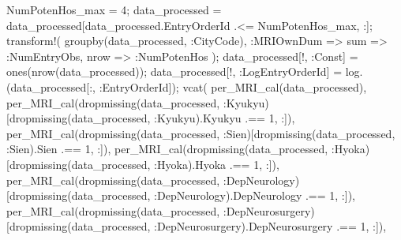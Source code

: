\documentclass[
  letterpaper,
  DIV=11,
  numbers=noendperiod]{scrreprt}
\newenvironment{Shaded}{\begin{snugshade}}{\end{snugshade}}
\newcommand{\FloatTok}[1]{\textcolor[rgb]{0.68,0.00,0.00}{#1}}
\newcommand{\FunctionTok}[1]{\textcolor[rgb]{0.28,0.35,0.67}{#1}}
\newcommand{\NormalTok}[1]{\textcolor[rgb]{0.00,0.23,0.31}{#1}}
\newcommand{\OperatorTok}[1]{\textcolor[rgb]{0.37,0.37,0.37}{#1}}
\begin{document}
\begin{Shaded}
\begin{Highlighting}[]
\NormalTok{NumPotenHos\_max }\OperatorTok{=} \FloatTok{4}\NormalTok{;}
\NormalTok{data\_processed }\OperatorTok{=}\NormalTok{ data\_processed[data\_processed.EntryOrderId }\OperatorTok{.\textless{}=}\NormalTok{ NumPotenHos\_max, }\OperatorTok{:}\NormalTok{];}
\FunctionTok{transform!}\NormalTok{(}
    \FunctionTok{groupby}\NormalTok{(data\_processed, }\OperatorTok{:}\NormalTok{CityCode),}
    \OperatorTok{:}\NormalTok{MRIOwnDum }\OperatorTok{=\textgreater{}}\NormalTok{ sum }\OperatorTok{=\textgreater{}} \OperatorTok{:}\NormalTok{NumEntryObs,}
\NormalTok{    nrow }\OperatorTok{=\textgreater{}} \OperatorTok{:}\NormalTok{NumPotenHos}
\NormalTok{);}
\NormalTok{data\_processed[!, }\OperatorTok{:}\NormalTok{Const] }\OperatorTok{=} \FunctionTok{ones}\NormalTok{(}\FunctionTok{nrow}\NormalTok{(data\_processed));}
\NormalTok{data\_processed[!, }\OperatorTok{:}\NormalTok{LogEntryOrderId] }\OperatorTok{=} \FunctionTok{log}\NormalTok{.(data\_processed[}\OperatorTok{:}\NormalTok{, }\OperatorTok{:}\NormalTok{EntryOrderId]);}
\FunctionTok{vcat}\NormalTok{(}
    \FunctionTok{per\_MRI\_cal}\NormalTok{(data\_processed),}
    \FunctionTok{per\_MRI\_cal}\NormalTok{(}\FunctionTok{dropmissing}\NormalTok{(data\_processed, }\OperatorTok{:}\NormalTok{Kyukyu)[}\FunctionTok{dropmissing}\NormalTok{(data\_processed, }\OperatorTok{:}\NormalTok{Kyukyu).Kyukyu }\OperatorTok{.==} \FloatTok{1}\NormalTok{, }\OperatorTok{:}\NormalTok{]),}
    \FunctionTok{per\_MRI\_cal}\NormalTok{(}\FunctionTok{dropmissing}\NormalTok{(data\_processed, }\OperatorTok{:}\NormalTok{Sien)[}\FunctionTok{dropmissing}\NormalTok{(data\_processed, }\OperatorTok{:}\NormalTok{Sien).Sien }\OperatorTok{.==} \FloatTok{1}\NormalTok{, }\OperatorTok{:}\NormalTok{]),}
    \FunctionTok{per\_MRI\_cal}\NormalTok{(}\FunctionTok{dropmissing}\NormalTok{(data\_processed, }\OperatorTok{:}\NormalTok{Hyoka)[}\FunctionTok{dropmissing}\NormalTok{(data\_processed, }\OperatorTok{:}\NormalTok{Hyoka).Hyoka }\OperatorTok{.==} \FloatTok{1}\NormalTok{, }\OperatorTok{:}\NormalTok{]),}
    \FunctionTok{per\_MRI\_cal}\NormalTok{(}\FunctionTok{dropmissing}\NormalTok{(data\_processed, }\OperatorTok{:}\NormalTok{DepNeurology)[}\FunctionTok{dropmissing}\NormalTok{(data\_processed, }\OperatorTok{:}\NormalTok{DepNeurology).DepNeurology }\OperatorTok{.==} \FloatTok{1}\NormalTok{, }\OperatorTok{:}\NormalTok{]),}
    \FunctionTok{per\_MRI\_cal}\NormalTok{(}\FunctionTok{dropmissing}\NormalTok{(data\_processed, }\OperatorTok{:}\NormalTok{DepNeurosurgery)[}\FunctionTok{dropmissing}\NormalTok{(data\_processed, }\OperatorTok{:}\NormalTok{DepNeurosurgery).DepNeurosurgery }\OperatorTok{.==} \FloatTok{1}\NormalTok{, }\OperatorTok{:}\NormalTok{]),}

\end{Highlighting}
\end{Shaded}
\end{document}
